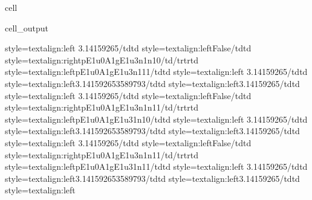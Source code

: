 \documentclass[letterpaper,table,10pt,english]{jupyterBook}
\begin{document}
\begin{sphinxuseclass}{cell}
\begin{sphinxVerbatimOutput}
\begin{sphinxuseclass}{cell_output}
\begin{sphinxVerbatim}[commandchars=\\\{\}]
style=\PYGZbs{}\PYGZsq{}text\PYGZhy{}align:left\PYGZbs{}\PYGZsq{}\PYGZgt{} 3.14159265\PYGZlt{}/td\PYGZgt{}\PYGZlt{}td style=\PYGZbs{}\PYGZsq{}text\PYGZhy{}align:left\PYGZbs{}\PYGZsq{}\PYGZgt{}False\PYGZlt{}/td\PYGZgt{}\PYGZlt{}td style=\PYGZbs{}\PYGZsq{}text\PYGZhy{}align:right\PYGZbs{}\PYGZsq{}\PYGZgt{}p\PYGZus{}E1u\PYGZus{}0\PYGZus{}A1g\PYGZus{}E1u\PYGZus{}3\PYGZus{}n1\PYGZus{}n1\PYGZus{}0\PYGZlt{}/td\PYGZgt{}\PYGZlt{}/tr\PYGZgt{}\PYGZlt{}tr\PYGZgt{}\PYGZlt{}td style=\PYGZbs{}\PYGZsq{}text\PYGZhy{}align:left\PYGZbs{}\PYGZsq{}\PYGZgt{}p\PYGZus{}E1u\PYGZus{}0\PYGZus{}A1g\PYGZus{}E1u\PYGZus{}3\PYGZus{}n1\PYGZus{}1\PYGZus{}1\PYGZlt{}/td\PYGZgt{}\PYGZlt{}td style=\PYGZbs{}\PYGZsq{}text\PYGZhy{}align:left\PYGZbs{}\PYGZsq{}\PYGZgt{} 3.14159265\PYGZlt{}/td\PYGZgt{}\PYGZlt{}td style=\PYGZbs{}\PYGZsq{}text\PYGZhy{}align:left\PYGZbs{}\PYGZsq{}\PYGZgt{}3.141592653589793\PYGZlt{}/td\PYGZgt{}\PYGZlt{}td style=\PYGZbs{}\PYGZsq{}text\PYGZhy{}align:left\PYGZbs{}\PYGZsq{}\PYGZgt{}\PYGZhy{}3.14159265\PYGZlt{}/td\PYGZgt{}\PYGZlt{}td style=\PYGZbs{}\PYGZsq{}text\PYGZhy{}align:left\PYGZbs{}\PYGZsq{}\PYGZgt{} 3.14159265\PYGZlt{}/td\PYGZgt{}\PYGZlt{}td style=\PYGZbs{}\PYGZsq{}text\PYGZhy{}align:left\PYGZbs{}\PYGZsq{}\PYGZgt{}False\PYGZlt{}/td\PYGZgt{}\PYGZlt{}td style=\PYGZbs{}\PYGZsq{}text\PYGZhy{}align:right\PYGZbs{}\PYGZsq{}\PYGZgt{}p\PYGZus{}E1u\PYGZus{}0\PYGZus{}A1g\PYGZus{}E1u\PYGZus{}3\PYGZus{}n1\PYGZus{}n1\PYGZus{}1\PYGZlt{}/td\PYGZgt{}\PYGZlt{}/tr\PYGZgt{}\PYGZlt{}tr\PYGZgt{}\PYGZlt{}td style=\PYGZbs{}\PYGZsq{}text\PYGZhy{}align:left\PYGZbs{}\PYGZsq{}\PYGZgt{}p\PYGZus{}E1u\PYGZus{}0\PYGZus{}A1g\PYGZus{}E1u\PYGZus{}3\PYGZus{}1\PYGZus{}n1\PYGZus{}0\PYGZlt{}/td\PYGZgt{}\PYGZlt{}td style=\PYGZbs{}\PYGZsq{}text\PYGZhy{}align:left\PYGZbs{}\PYGZsq{}\PYGZgt{} 3.14159265\PYGZlt{}/td\PYGZgt{}\PYGZlt{}td style=\PYGZbs{}\PYGZsq{}text\PYGZhy{}align:left\PYGZbs{}\PYGZsq{}\PYGZgt{}3.141592653589793\PYGZlt{}/td\PYGZgt{}\PYGZlt{}td style=\PYGZbs{}\PYGZsq{}text\PYGZhy{}align:left\PYGZbs{}\PYGZsq{}\PYGZgt{}\PYGZhy{}3.14159265\PYGZlt{}/td\PYGZgt{}\PYGZlt{}td style=\PYGZbs{}\PYGZsq{}text\PYGZhy{}align:left\PYGZbs{}\PYGZsq{}\PYGZgt{} 3.14159265\PYGZlt{}/td\PYGZgt{}\PYGZlt{}td style=\PYGZbs{}\PYGZsq{}text\PYGZhy{}align:left\PYGZbs{}\PYGZsq{}\PYGZgt{}False\PYGZlt{}/td\PYGZgt{}\PYGZlt{}td style=\PYGZbs{}\PYGZsq{}text\PYGZhy{}align:right\PYGZbs{}\PYGZsq{}\PYGZgt{}p\PYGZus{}E1u\PYGZus{}0\PYGZus{}A1g\PYGZus{}E1u\PYGZus{}3\PYGZus{}n1\PYGZus{}n1\PYGZus{}1\PYGZlt{}/td\PYGZgt{}\PYGZlt{}/tr\PYGZgt{}\PYGZlt{}tr\PYGZgt{}\PYGZlt{}td style=\PYGZbs{}\PYGZsq{}text\PYGZhy{}align:left\PYGZbs{}\PYGZsq{}\PYGZgt{}p\PYGZus{}E1u\PYGZus{}0\PYGZus{}A1g\PYGZus{}E1u\PYGZus{}3\PYGZus{}1\PYGZus{}n1\PYGZus{}1\PYGZlt{}/td\PYGZgt{}\PYGZlt{}td style=\PYGZbs{}\PYGZsq{}text\PYGZhy{}align:left\PYGZbs{}\PYGZsq{}\PYGZgt{} 3.14159265\PYGZlt{}/td\PYGZgt{}\PYGZlt{}td style=\PYGZbs{}\PYGZsq{}text\PYGZhy{}align:left\PYGZbs{}\PYGZsq{}\PYGZgt{}3.141592653589793\PYGZlt{}/td\PYGZgt{}\PYGZlt{}td style=\PYGZbs{}\PYGZsq{}text\PYGZhy{}align:left\PYGZbs{}\PYGZsq{}\PYGZgt{}\PYGZhy{}3.14159265\PYGZlt{}/td\PYGZgt{}\PYGZlt{}td style=\PYGZbs{}\PYGZsq{}text\PYGZhy{}align:left\PYGZbs{}\PYGZsq{}\PYGZgt{} 
\end{sphinxVerbatim}
\end{sphinxuseclass}
\end{sphinxVerbatimOutput}
\end{sphinxuseclass}
\end{document}
